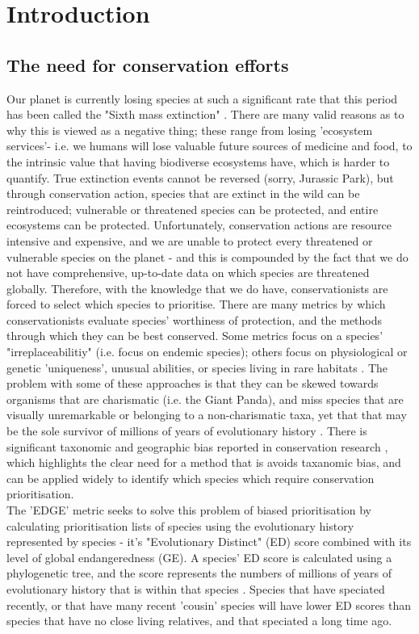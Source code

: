\documentclass[11pt]{article}
\begin{document}
	
	\section{Introduction}
	\noindent

\subsection{The need for conservation efforts }
Our planet is currently losing species at such a significant rate that this 
period has been called the "Sixth mass extinction" 
\autocite{Barnosky2011}. There are many valid reasons as to why this is viewed 
as a negative thing; these range from losing 'ecosystem services'- i.e. we 
humans will lose valuable future sources of medicine and food, to the 
intrinsic value that having biodiverse ecosystems have, which is harder to 
quantify. True extinction events cannot be reversed (sorry, Jurassic Park), but 
through conservation action, species that are extinct in the wild can be 
reintroduced; vulnerable or threatened species can be protected, and entire 
ecosystems can be protected. Unfortunately, conservation actions are
resource intensive and expensive, and we are unable to protect every 
threatened or 
vulnerable species on the planet - and this is compounded by the fact that we 
do not have comprehensive, up-to-date data on which species are threatened 
globally. Therefore, with the knowledge that we do have, conservationists are 
forced to select which species to prioritise. There are many metrics by 
which conservationists evaluate species' worthiness of protection, and the 
methods through which they can be best conserved. Some metrics focus on a 
species' "irreplaceabilitiy" (i.e. focus on endemic species); others focus on 
physiological or genetic 'uniqueness', unusual abilities, or species living in 
rare habitats \autocite{Brooks2006}. The problem with some of these approaches 
is that they can be skewed towards organisms that are charismatic (i.e. the 
Giant Panda), and miss species that are visually unremarkable or belonging to a 
non-charismatic taxa, yet that that 
may be the sole survivor of millions of years of evolutionary history 
\autocite{Clark2002}. There is significant taxonomic and geographic bias 
reported in conservation research \autocite{Clark2002, Darwall2011, 
Watson2017}, which highlights the clear need for a method that is avoids 
taxanomic bias, and can be applied widely to identify which species which 
require conservation 
prioritisation. \\ The 
'EDGE' metric seeks to solve this problem of biased prioritisation by 
calculating prioritisation lists of species using the evolutionary history 
represented by species - it's "Evolutionary Distinct" (ED) score combined with 
its level of global endangeredness (GE). A species' ED score is calculated 
using a phylogenetic 
tree, and the score represents the numbers of millions of years of evolutionary 
history that is within that species \autocite{Isaac2007}. Species that have 
speciated recently, or that have many recent 'cousin' species will have lower 
ED scores than species that have no close living relatives, and that speciated 
a long time ago. 
\end{document}
